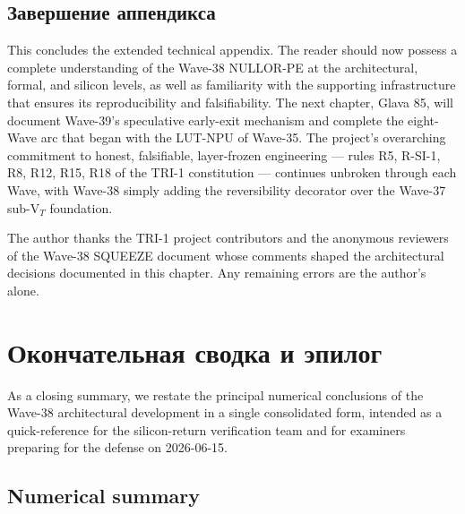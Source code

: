 \subsection{Завершение аппендикса}
\label{subsec:appK}

This concludes the extended technical appendix.  The reader should now possess
a complete understanding of the Wave-38 NULLOR-PE at the architectural,
formal, and silicon levels, as well as familiarity with the supporting
infrastructure that ensures its reproducibility and falsifiability.  The next
chapter, Glava 85, will document Wave-39's speculative early-exit mechanism
and complete the eight-Wave arc that began with the LUT-NPU of Wave-35.  The
project's overarching commitment to honest, falsifiable, layer-frozen
engineering --- rules R5, R-SI-1, R8, R12, R15, R18 of the TRI-1 constitution
--- continues unbroken through each Wave, with Wave-38 simply adding the
reversibility decorator over the Wave-37 sub-V$_T$ foundation.

The author thanks the TRI-1 project contributors and the anonymous reviewers
of the Wave-38 SQUEEZE document whose comments shaped the architectural
decisions documented in this chapter.  Any remaining errors are the author's
alone.

\section{Окончательная сводка и эпилог}
\label{sec:epilogue}

As a closing summary, we restate the principal numerical conclusions of the
Wave-38 architectural development in a single consolidated form, intended as a
quick-reference for the silicon-return verification team and for examiners
preparing for the defense on 2026-06-15.

\subsection{Numerical summary}
\label{subsec:numsum}

